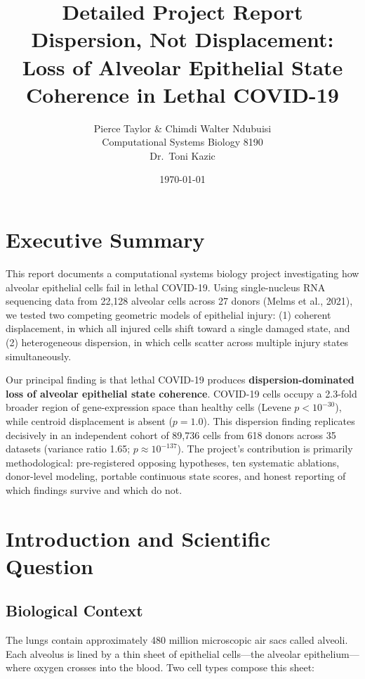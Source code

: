 \documentclass[11pt]{article}
\title{\textbf{Detailed Project Report}\\[6pt]
\Large Dispersion, Not Displacement:\\
Loss of Alveolar Epithelial State Coherence in Lethal COVID-19}
\author{Pierce Taylor \& Chimdi Walter Ndubuisi\\
Computational Systems Biology 8190\\
Dr.\ Toni Kazic}
\date{\today}
\begin{document}
\maketitle

\tableofcontents
\clearpage


\section{Executive Summary}

This report documents a computational systems biology project investigating how alveolar epithelial cells fail in lethal COVID-19. Using single-nucleus RNA sequencing data from 22,128 alveolar cells across 27 donors (Melms et al., 2021), we tested two competing geometric models of epithelial injury: (1) coherent displacement, in which all injured cells shift toward a single damaged state, and (2) heterogeneous dispersion, in which cells scatter across multiple injury states simultaneously.

Our principal finding is that lethal COVID-19 produces \textbf{dispersion-dominated loss of alveolar epithelial state coherence}. COVID-19 cells occupy a 2.3-fold broader region of gene-expression space than healthy cells (Levene $p < 10^{-30}$), while centroid displacement is absent ($p = 1.0$). This dispersion finding replicates decisively in an independent cohort of 89,736 cells from 618 donors across 35 datasets (variance ratio 1.65; $p \approx 10^{-137}$). The project's contribution is primarily methodological: pre-registered opposing hypotheses, ten systematic ablations, donor-level modeling, portable continuous state scores, and honest reporting of which findings survive and which do not.


\section{Introduction and Scientific Question}

\subsection{Biological Context}

The lungs contain approximately 480 million microscopic air sacs called alveoli. Each alveolus is lined by a thin sheet of epithelial cells---the alveolar epithelium---where oxygen crosses into the blood. Two cell types compose this sheet:
\end{document}
